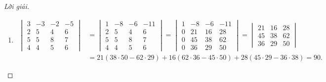 \begin{proof}[Lời giải]
\begin{enumerate}[label = (\alph*)]
\begin{align*}
\begin{vmatrix}
                      2 & -5 & 4 & 3  \\
                      0 & 1  & 0 & -1 \\
                      0 & 0  & 2 & 6  \\
                      0 & 0  & 0 & 1
                  \end{vmatrix}
                  = 2\cdot 1\cdot 2\cdot 1 = 4.
              \end{align*}
        \item
              \begin{align*}
                  \begin{vmatrix}
                      3 & -3 & -2 & -5 \\
                      2 & 5  & 4  & 6  \\
                      5 & 5  & 8  & 7  \\
                      4 & 4  & 5  & 6
                  \end{vmatrix}
                   & =
                  \begin{vmatrix}
                      1 & -8 & -6 & -11 \\
                      2 & 5  & 4  & 6   \\
                      5 & 5  & 8  & 7   \\
                      4 & 4  & 5  & 6
                  \end{vmatrix}
                  =
                  \begin{vmatrix}
                      1 & -8 & -6 & -11 \\
                      0 & 21 & 16 & 28  \\
                      0 & 45 & 38 & 62  \\
                      0 & 36 & 29 & 50
                  \end{vmatrix}
                  =
                  \begin{vmatrix}
                      21 & 16 & 28 \\
                      45 & 38 & 62 \\
                      36 & 29 & 50
                  \end{vmatrix}                                                                                     \\
                   & = 21(38\cdot 50 - 62\cdot 29) + 16(62\cdot 36 - 45\cdot 50) + 28(45\cdot 29 - 36\cdot 38) = 90.
              \end{align*}
    \end{enumerate}
\end{proof}

